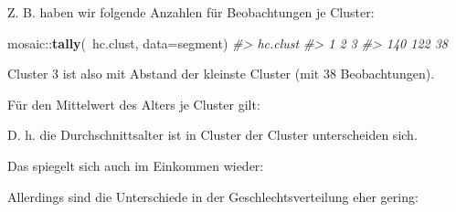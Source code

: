 \documentclass[12pt,]{book}
\newenvironment{Shaded}{\begin{snugshade}}{\end{snugshade}}
\newcommand{\KeywordTok}[1]{\textcolor[rgb]{0.13,0.29,0.53}{\textbf{{#1}}}}
\newcommand{\DataTypeTok}[1]{\textcolor[rgb]{0.13,0.29,0.53}{{#1}}}
\newcommand{\StringTok}[1]{\textcolor[rgb]{0.31,0.60,0.02}{{#1}}}
\newcommand{\CommentTok}[1]{\textcolor[rgb]{0.56,0.35,0.01}{\textit{{#1}}}}
\newcommand{\NormalTok}[1]{{#1}}
\begin{document}
Z. B. haben wir folgende Anzahlen für Beobachtungen je Cluster:

\begin{Shaded}
\begin{Highlighting}[]
\NormalTok{mosaic::}\KeywordTok{tally}\NormalTok{(~hc.clust, }\DataTypeTok{data=}\NormalTok{segment)}
\CommentTok{#> hc.clust}
\CommentTok{#>   1   2   3 }
\CommentTok{#> 140 122  38}
\end{Highlighting}
\end{Shaded}

Cluster 3 ist also mit Abstand der kleinste Cluster (mit 38
Beobachtungen).

Für den Mittelwert des Alters je Cluster gilt:

\begin{Shaded}
\end{Shaded}

D. h. die Durchschnittsalter ist in Cluster der Cluster unterscheiden
sich.

Das spiegelt sich auch im Einkommen wieder:

\begin{Shaded}
\end{Shaded}

Allerdings sind die Unterschiede in der Geschlechtsverteilung eher
gering:
\end{document}
